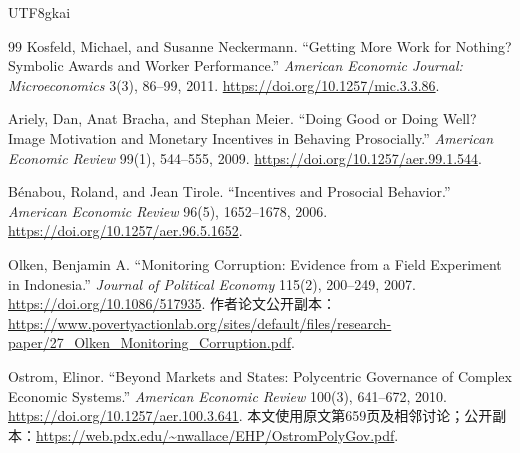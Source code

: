\documentclass[12pt,a4paper,openany]{report}
\begin{document}
\begin{CJK*}{UTF8}{gkai}
\begin{thebibliography}{99}
 Kosfeld, Michael, and Susanne Neckermann.
``Getting More Work for Nothing? Symbolic Awards and Worker Performance.''
\emph{American Economic Journal: Microeconomics} 3(3), 86--99, 2011.
\newblock\url{https://doi.org/10.1257/mic.3.3.86}.

 Ariely, Dan, Anat Bracha, and Stephan Meier.
``Doing Good or Doing Well? Image Motivation and Monetary Incentives in Behaving Prosocially.''
\emph{American Economic Review} 99(1), 544--555, 2009.
\newblock\url{https://doi.org/10.1257/aer.99.1.544}.

 B\'enabou, Roland, and Jean Tirole.
``Incentives and Prosocial Behavior.''
\emph{American Economic Review} 96(5), 1652--1678, 2006.
\newblock\url{https://doi.org/10.1257/aer.96.5.1652}.

 Olken, Benjamin A.
``Monitoring Corruption: Evidence from a Field Experiment in Indonesia.''
\emph{Journal of Political Economy} 115(2), 200--249, 2007.
\newblock\url{https://doi.org/10.1086/517935}.
\newblock 作者论文公开副本：\url{https://www.povertyactionlab.org/sites/default/files/research-paper/27_Olken_Monitoring_Corruption.pdf}.

 Ostrom, Elinor.
``Beyond Markets and States: Polycentric Governance of Complex Economic Systems.''
\emph{American Economic Review} 100(3), 641--672, 2010.
\newblock\url{https://doi.org/10.1257/aer.100.3.641}.
\newblock 本文使用原文第659页及相邻讨论；公开副本：\url{https://web.pdx.edu/~nwallace/EHP/OstromPolyGov.pdf}.
\end{thebibliography}
\end{CJK*}
\end{document}
